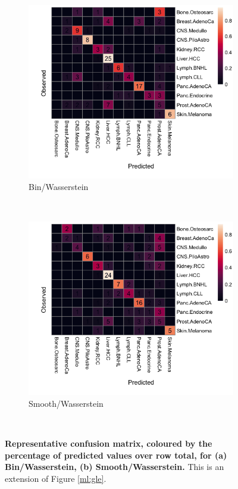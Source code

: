 \begin{figure}[ht!]
    \begin{subfigure}{.5\textwidth}
    \centering
    \includegraphics[width=\textwidth,height=0.9\textwidth]{graphics/confusion_matrix_bins_wasserstein.png}
    \caption{Bin/Wasserstein}
    \label{fig:confusion_bin_Wasserstein}
    \end{subfigure}
    ~
    \begin{subfigure}{.5\textwidth}
    \centering
    \includegraphics[width=\textwidth,height=0.9\textwidth]{graphics/confusion_matrix_smooth_wasserstein.png}
    \caption{Smooth/Wasserstein}
    \label{fig:confusion_smooth_wasserstein}
    \end{subfigure} \\
    \vspace{0.5cm}
    
    \caption{\textbf{Representative confusion matrix, coloured by the percentage of predicted values over row total, for (a) Bin/Wasserstein, (b) Smooth/Wasserstein.} This is an extension of Figure \ref{ml:gle}.}
    \label{fig:apdx_ml_gle}
\end{figure}